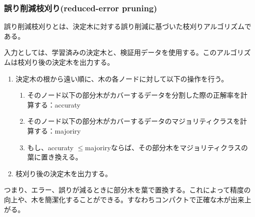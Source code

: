 \documentclass[dvipdfmx]{jsarticle}
\begin{document}
\subsubsection{誤り削減枝刈り(reduced-error pruning)}
誤り削減枝刈りとは、決定木に対する誤り削減に基づいた枝刈りアルゴリズムである。\par
入力としては、学習済みの決定木と、検証用データを使用する。このアルゴリズムは枝刈り後の決定木を出力する。
\begin{enumerate}
  \item 決定木の根から遠い順に、木の各ノードに対して以下の操作を行う。
  \begin{enumerate}
    \item そのノード以下の部分木がカバーするデータを分割した際の正解率を計算する：accuraty
    \item そのノード以下の部分木がカバーするデータのマジョリティクラスを計算する：majoriry
    \item もし、accuraty $\leq$majoriryならば、その部分木をマジョリティクラスの葉に置き換える。
  \end{enumerate}
  \item 枝刈り後の決定木を出力する。
\end{enumerate}
つまり、エラー、誤りが減るときに部分木を葉で置換する。これによって精度の向上や、木を簡潔化することができる。すなわちコンパクトで正確な木が出来上がる。
\end{document}

